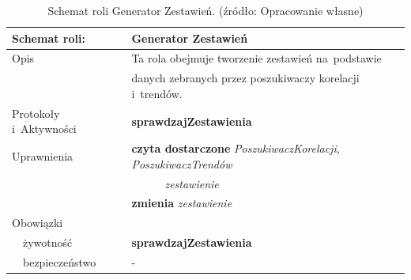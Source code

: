 \documentclass[11pt]{report}
\begin{document}
    \begin{table}[ht!]
        \begin{tabular}{ll}
            Schemat roli:          & Generator Zestawień                                                          \\ \hline
            Opis                   & Ta rola obejmuje tworzenie zestawień na~podstawie                            \\
            & danych zebranych przez poszukiwaczy korelacji i~trendów.                     \\
            Protokoły i~Aktywności & \textbf{sprawdzajZestawienia}                                                \\
            Uprawnienia            & \textbf{czyta dostarczone} \textit{PoszukiwaczKorelacji, PoszukiwaczTrendów} \\
            & ~~~~~~\textit{zestawienie}                                                   \\
            & \textbf{zmienia} \textit{zestawienie}                                        \\
            Obowiązki              &                                                                              \\
            ~~żywotność            & \textbf{sprawdzajZestawienia}                                                \\
            ~~bezpieczeństwo       & -                                                                            \\
        \end{tabular}
        \caption{Schemat roli Generator Zestawień. (źródło: Opracowanie własne)}
        \label{tab:schemat roli Generator Zestawień}
    \end{table}
\end{document}
